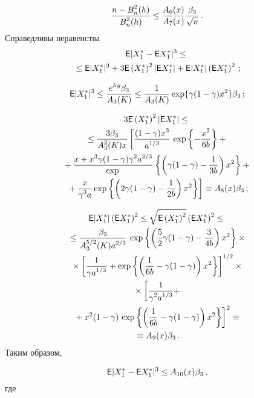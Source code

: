 \begin{multicols}{2}
\vspace*{-6pt}

\noindent
\begin{equation}
\fr{n-B_n^2(h)}{B_n^2(h)}\le\fr{A_6(x)}{A_7(x)}\Lo\,.\label{e14gv}
\end{equation}
Справедливы неравенства
\begin{multline*}
{\sf E}|X_1^*-{\sf E}X_1^*|^3\le{}\\
{}\le {\sf E}|X_1^*|^3+3{\sf
E}\left(X_1^*\right)^2|{\sf E}X_1^*|
+{\sf E}|X_1^*|\left({\sf E}X_1^*\right)^2\,;
\end{multline*}

\noindent
$$
{\sf
E}|X_1^*|^3\le\fr{e^{hy}\betr}{A_3(K)}\le\fr{1}{A_3(K)}\exp\{\gamma(1-\gamma)x^2\}\betr\,;
$$


\noindent
\begin{multline*}
3{\sf E}\left(X_1^*\right)^2\left|{\sf
E}X_1^*\right|\le{}\\
{}\le\fr{3\betr}{A_3^2(K)x}\left[\fr{(1-\gamma)x^3}{a^{1/3}}\,
\exp\left\{-\fr{x^2}{6b}\right\}+{}\right.\\
{}+
\fr{x+x^3\gamma(1-\gamma){\gamma^{2}a^{2/3}}}{\exp}\left\{\left(\gamma(1-\gamma)-
\fr{1}{3b}\right)x^2\right\}+{}\\
\left.{}+
\fr{x}{\gamma^{3}a}\exp\left\{\left(2\gamma(1-\gamma)-\fr{1}{2b}\right)x^2\right\}\right]
\equiv A_8(x)\betr\,;
\end{multline*}

\noindent
\begin{multline*}
{\sf E}|X_1^*|\left({\sf E}X_1^*\right)^2\le\sqrt{{\sf
E}\left(X_1^*\right)^2}\left({\sf E}X_1^*\right)^2\le{}\\
{}\le
\fr{\betr }{A_3^{5/2}(K)a^{2/3}}\,
\exp\left\{\left(\fr{5}{2}\gamma(1-\gamma)-\fr{3}{4b}\right)x^2\right\}\times{}\\
{}\times
\left[\fr{1}{\gamma
a^{1/3}}+\exp\left\{\left(\fr{1}{6b}-\gamma(1-\gamma)\right)x^2\right\}\right]^{1/2}\times{}\\
{}
\times\left[\fr{1}{\gamma^{2}a^{1/3}}+\right.\\
\left.{}+x^2(1-\gamma)\,\exp\left\{\left(\fr{1}{6b}-
\gamma(1-\gamma)\right)x^2\right\}\right]^2\equiv{}\\
{}\equiv A_9(x)\betr\,.
\end{multline*}
Таким образом,

\noindent
\begin{equation}
{\sf E}|X_1^*-{\sf E}X_1^*|^3\le A_{10}(x)\betr\,,\label{e15gv}
\end{equation}
где


\end{multicols}
